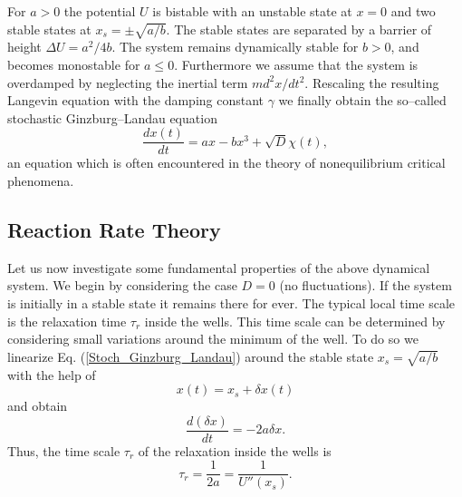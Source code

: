 For $a> 0$ the potential $U$ is bistable with an unstable state at $x=0$
and two stable states at $x_s = \pm \sqrt{a/b}$. The stable states are
separated by a barrier of height $\Delta U = a^2/4b$. The system remains
dynamically stable for $b>0$, and becomes monostable for $a \le 0$.
Furthermore we assume that the system is overdamped by neglecting the inertial
term $m d^2x/dt^2$. 
Rescaling the resulting Langevin equation with the damping constant
$\gamma$  we finally obtain the so--called stochastic Ginzburg--Landau
equation
\begin{equation}
\label{Stoch_Ginzburg_Landau}
\frac{dx(t)}{dt} = ax - bx^3 + \sqrt{D} \chi(t),
\end{equation}
an equation which is often encountered in the theory of nonequilibrium
critical phenomena. 

\subsection{Reaction Rate Theory}
Let us now investigate some fundamental properties of the above dynamical
system. We begin by considering the case $D=0$ (no fluctuations). If the 
system is initially in a stable state it remains there for ever. 
The typical local
time scale is the relaxation time $\tau_r$ inside the wells. This time scale 
can be determined by considering small variations around the 
minimum of the well.
To do so we linearize Eq. (\ref{Stoch_Ginzburg_Landau}) 
around the stable state $x_s = \sqrt{a/b}$ with the help of
\begin{equation}
x(t) = x_s + \delta x(t)
\end{equation}
and obtain
\begin{equation}
\frac{d(\delta x)}{dt} = -2a \delta x.
\end{equation}
Thus, the  time scale $\tau_r$ of the relaxation inside the wells is
\begin{equation}
  \tau_r = \frac{1}{2a} = \frac{1}{U''(x_s)}.
\end{equation}

